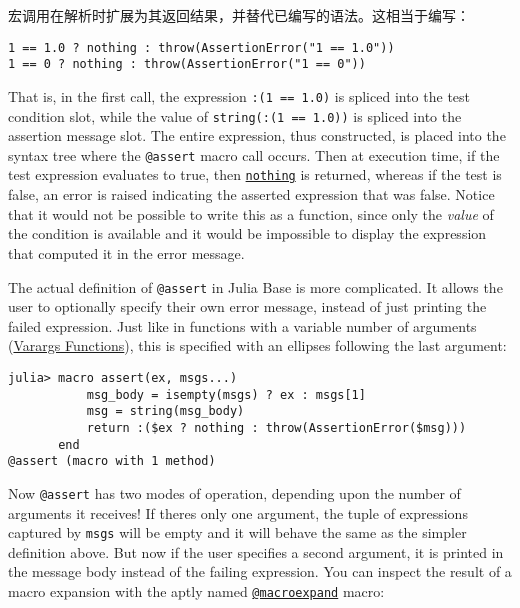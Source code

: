 宏调用在解析时扩展为其返回结果，并替代已编写的语法。这相当于编写：




\begin{verbatim}
1 == 1.0 ? nothing : throw(AssertionError("1 == 1.0"))
1 == 0 ? nothing : throw(AssertionError("1 == 0"))
\end{verbatim}



That is, in the first call, the expression \texttt{:(1 == 1.0)} is spliced into the test condition slot, while the value of \texttt{string(:(1 == 1.0))} is spliced into the assertion message slot. The entire expression, thus constructed, is placed into the syntax tree where the \texttt{@assert} macro call occurs. Then at execution time, if the test expression evaluates to true, then \hyperlink{9331422207248206047}{\texttt{nothing}} is returned, whereas if the test is false, an error is raised indicating the asserted expression that was false. Notice that it would not be possible to write this as a function, since only the \emph{value} of the condition is available and it would be impossible to display the expression that computed it in the error message.



The actual definition of \texttt{@assert} in Julia Base is more complicated. It allows the user to optionally specify their own error message, instead of just printing the failed expression. Just like in functions with a variable number of arguments (\href{@ref}{Varargs Functions}), this is specified with an ellipses following the last argument:




\begin{verbatim}
julia> macro assert(ex, msgs...)
           msg_body = isempty(msgs) ? ex : msgs[1]
           msg = string(msg_body)
           return :($ex ? nothing : throw(AssertionError($msg)))
       end
@assert (macro with 1 method)
\end{verbatim}



Now \texttt{@assert} has two modes of operation, depending upon the number of arguments it receives! If there{\textquotesingle}s only one argument, the tuple of expressions captured by \texttt{msgs} will be empty and it will behave the same as the simpler definition above. But now if the user specifies a second argument, it is printed in the message body instead of the failing expression. You can inspect the result of a macro expansion with the aptly named \hyperlink{14913190777653949565}{\texttt{@macroexpand}} macro:




